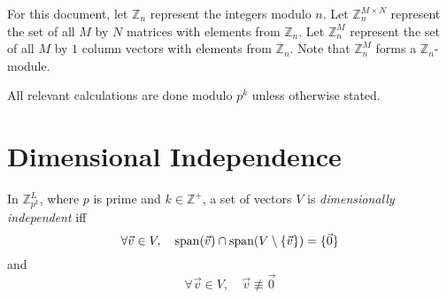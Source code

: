 \documentclass[a4paper, 12pt, reqno]{amsart}
\newcommand\vecspan[1]{\textup{span}(#1)}
\begin{document}
	For this document, let $\mathds{Z}_n$ represent the integers modulo $n$. Let $\mathds{Z}_{n}^{M \times N}$ represent the set of all $M$ by $N$ matrices with elements 
	from $\mathds{Z}_n$. Let $\mathds{Z}_{n}^{M}$ represent the set of all $M$ by $1$ column vectors with elements from $\mathds{Z}_n$. Note that $\mathds{Z}_{n}^M$ forms a 
	$\mathds{Z}_{n}$-module.
	
	All relevant calculations are done modulo $p^k$ unless otherwise stated.
		
	\section{Dimensional Independence}
		\label{sec:DI}
		In $\mathds{Z}_{p^k}^L$, where $p$ is prime and $k \in \mathds{Z}^+$, a set of vectors $V$ is \emph{dimensionally independent} iff
		\[
			\forall \vec{v} \in V, \quad \vecspan{\vec{v}} \cap \vecspan{V \setminus \{\vec{v}\}} = \{\vec{0}\}
		\]
		and
		\[
			\forall \vec{v} \in V, \quad \vec{v} \not\equiv \vec{0}
		\]
		
\end{document}
